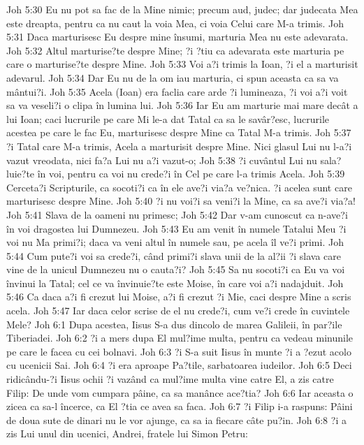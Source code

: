 Joh 5:30  Eu nu pot sa fac de la Mine nimic; precum aud, judec; dar judecata Mea este dreapta, pentru ca nu caut la voia Mea, ci voia Celui care M-a trimis.
Joh 5:31  Daca marturisesc Eu despre mine însumi, marturia Mea nu este adevarata.
Joh 5:32  Altul marturise?te despre Mine; ?i ?tiu ca adevarata este marturia pe care o marturise?te despre Mine.
Joh 5:33  Voi a?i trimis la Ioan, ?i el a marturisit adevarul.
Joh 5:34  Dar Eu nu de la om iau marturia, ci spun aceasta ca sa va mântui?i.
Joh 5:35  Acela (Ioan) era faclia care arde ?i lumineaza, ?i voi a?i voit sa va veseli?i o clipa în lumina lui.
Joh 5:36  Iar Eu am marturie mai mare decât a lui Ioan; caci lucrurile pe care Mi le-a dat Tatal ca sa le savâr?esc, lucrurile acestea pe care le fac Eu, marturisesc despre Mine ca Tatal M-a trimis.
Joh 5:37  ?i Tatal care M-a trimis, Acela a marturisit despre Mine. Nici glasul Lui nu l-a?i vazut vreodata, nici fa?a Lui nu a?i vazut-o;
Joh 5:38  ?i cuvântul Lui nu sala?luie?te în voi, pentru ca voi nu crede?i în Cel pe care l-a trimis Acela.
Joh 5:39  Cerceta?i Scripturile, ca socoti?i ca în ele ave?i via?a ve?nica. ?i acelea sunt care marturisesc despre Mine.
Joh 5:40  ?i nu voi?i sa veni?i la Mine, ca sa ave?i via?a!
Joh 5:41  Slava de la oameni nu primesc;
Joh 5:42  Dar v-am cunoscut ca n-ave?i în voi dragostea lui Dumnezeu.
Joh 5:43  Eu am venit în numele Tatalui Meu ?i voi nu Ma primi?i; daca va veni altul în numele sau, pe acela îl ve?i primi.
Joh 5:44  Cum pute?i voi sa crede?i, când primi?i slava unii de la al?ii ?i slava care vine de la unicul Dumnezeu nu o cauta?i?
Joh 5:45  Sa nu socoti?i ca Eu va voi învinui la Tatal; cel ce va învinuie?te este Moise, în care voi a?i nadajduit.
Joh 5:46  Ca daca a?i fi crezut lui Moise, a?i fi crezut ?i Mie, caci despre Mine a scris acela.
Joh 5:47  Iar daca celor scrise de el nu crede?i, cum ve?i crede în cuvintele Mele?
Joh 6:1  Dupa acestea, Iisus S-a dus dincolo de marea Galileii, în par?ile Tiberiadei.
Joh 6:2  ?i a mers dupa El mul?ime multa, pentru ca vedeau minunile pe care le facea cu cei bolnavi.
Joh 6:3  ?i S-a suit Iisus în munte ?i a ?ezut acolo cu ucenicii Sai.
Joh 6:4  ?i era aproape Pa?tile, sarbatoarea iudeilor.
Joh 6:5  Deci ridicându-?i Iisus ochii ?i vazând ca mul?ime multa vine catre El, a zis catre Filip: De unde vom cumpara pâine, ca sa manânce ace?tia?
Joh 6:6  Iar aceasta o zicea ca sa-l încerce, ca El ?tia ce avea sa faca.
Joh 6:7  ?i Filip i-a raspuns: Pâini de doua sute de dinari nu le vor ajunge, ca sa ia fiecare câte pu?in.
Joh 6:8  ?i a zis Lui unul din ucenici, Andrei, fratele lui Simon Petru:

